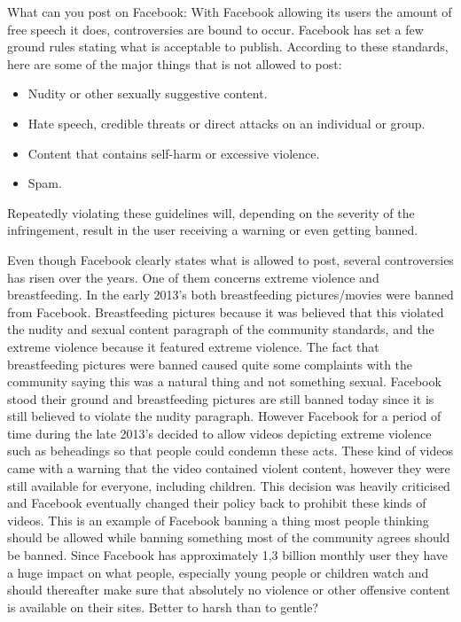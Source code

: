 \documentclass[conference]{IEEEtran}
\begin{document}
What can you post on Facebook:
With Facebook allowing its users the amount of free speech it does, controversies are bound to occur. Facebook has set a few ground rules stating what is acceptable to publish. According to these standards, here are some of the major things that is not allowed to post\cite{FCS}:

\begin{itemize}
  \item Nudity or other sexually suggestive content.
  \item Hate speech, credible threats or direct attacks on an individual or group.
  \item Content that contains self-harm or excessive violence.
  \item Spam.
\end{itemize}


Repeatedly violating these guidelines will, depending on the severity of the infringement, result in the user receiving a warning or even getting banned.

Even though Facebook clearly states what is allowed to post, several controversies has risen over the years. One of them concerns extreme violence and breastfeeding.
In the early 2013’s both breastfeeding pictures/movies were banned from Facebook. Breastfeeding pictures because it was believed that this violated the nudity and sexual content paragraph of the community standards, and the extreme violence because it featured extreme violence. The fact that breastfeeding pictures were banned caused quite some complaints with the community saying this was a natural thing and not something sexual. Facebook stood their ground and breastfeeding pictures are still banned today since it is still believed to violate the nudity paragraph. However Facebook for a period of time during the late 2013’s decided to allow videos depicting extreme violence such as beheadings so that people could condemn these acts. These kind of videos came with a warning that the video contained violent content, however they were still available for everyone, including children. This decision was heavily criticised and Facebook eventually changed their policy back to prohibit these kinds of videos.
This is an example of Facebook banning a thing most people thinking should be allowed while banning something most of the community agrees should be banned. Since Facebook has approximately 1,3 billion monthly user they have a huge impact on what people, especially young people or children watch and should thereafter make sure that absolutely no violence or other offensive content is available on their sites. Better to harsh than to gentle?\cite{WikiCriticism2014}
\end{document}
